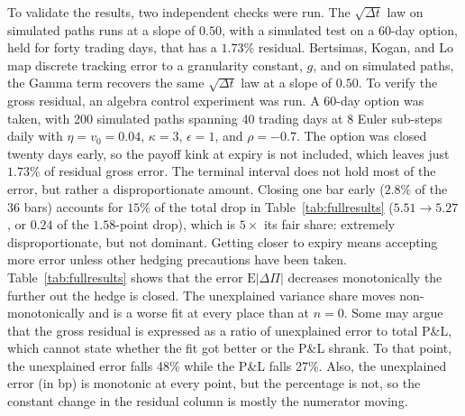 \documentclass[11pt]{article}
\begin{document}
To validate the results, two independent checks were run. The $\sqrt{\Delta t}$ law on simulated paths runs at a slope of $0.50$, with a simulated test on a 60-day option, held for forty trading days, that has a $1.73\%$ residual. Bertsimas, Kogan, and Lo \cite{bertsimas2000} map discrete tracking error to a granularity constant, $g$, and on simulated paths, the Gamma term recovers the same $\sqrt{\Delta t}$ law at a slope of $0.50$. To verify the gross residual, an algebra control experiment was run. A 60-day option was taken, with 200 simulated paths spanning 40 trading days at 8 Euler sub-steps daily with $\eta = v_0 = 0.04$, $\kappa = 3$, $\epsilon = 1$, and $\rho = -0.7$. The option was closed twenty
days early, so the payoff kink at expiry is not included, which leaves just $1.73\%$ of residual gross error.
The terminal interval does not hold most of the error, but rather a disproportionate amount. Closing one bar early ($2.8\%$ of the 36 bars) accounts for $15\%$ of the total drop in Table~\ref{tab:fullresults} ($5.51 \to 5.27$, or $0.24$ of the $1.58$-point drop), which is $5\times$ its fair share: extremely disproportionate, but not dominant.
Getting closer to expiry means accepting more error unless other hedging precautions have been taken.
Table~\ref{tab:fullresults} shows that the error $\mathrm{E}|\Delta\Pi|$ decreases monotonically the further out the hedge is closed. The unexplained variance share moves non-monotonically and is a worse fit at every place than at $n = 0$. Some may argue that the gross residual is expressed as a ratio of unexplained error to total P\&L, which cannot state whether the fit got better or the P\&L shrank.
To that point, the unexplained error falls 48\% while the P\&L falls 27\%. Also, the unexplained error (in bp) is monotonic at every point, but the percentage is not, so the constant change in the residual column is mostly the numerator moving.
\end{document}
